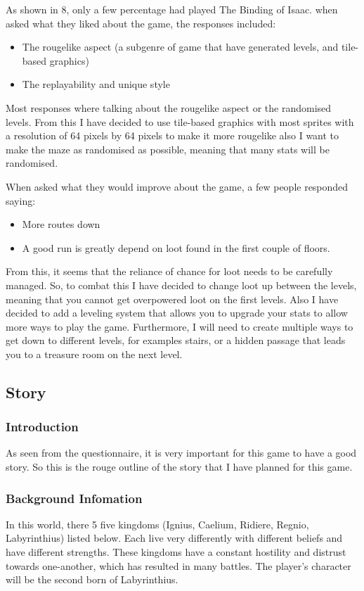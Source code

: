 \documentclass{article}
\begin{document}
            As shown in \figurename{ 8}, only a few percentage had played The Binding of Isaac. when asked what they liked about the game, the responses included:
            \begin{itemize}
                \item The rougelike aspect (a subgenre of game that have generated levels, and tile-based graphics)
                \item The replayability and unique style
            \end{itemize}
            Most responses where talking about the rougelike aspect or the randomised levels. From this I have decided to use tile-based graphics with most sprites with a resolution of 64 pixels by 64 pixels to make it more rougelike also I want to make the maze as randomised as possible, meaning that many stats will be randomised.

            When asked what they would improve about the game, a few people responded saying:
            \begin{itemize}
                \item More routes down
                \item A good run is greatly depend on loot found in the first couple of floors.
            \end{itemize}
            From this, it seems that the reliance of chance for loot needs to be carefully managed. So, to combat this I have decided to change loot up between the levels, meaning that you cannot get overpowered loot on the first levels. Also I have decided to add a leveling system that allows you to upgrade your stats to allow more ways to play the game. Furthermore, I will need to create multiple ways to get down to different levels, for examples stairs, or a hidden passage that leads you to a treasure room on the next level.
        \subsection{Story}
            \subsubsection{Introduction}
                As seen from the questionnaire, it is very important for this game to have a good story. So this is the rouge outline of the story that I have planned for this game.
            \subsubsection{Background Infomation}
                In this world, there 5 five kingdoms (Ignius, Caelium, Ridiere, Regnio, Labyrinthius) listed below. Each live very differently with different beliefs and have different strengths. These kingdoms have a constant hostility and distrust towards one-another, which has resulted in many battles. The player's character will be the second born of Labyrinthius.
\end{document}
